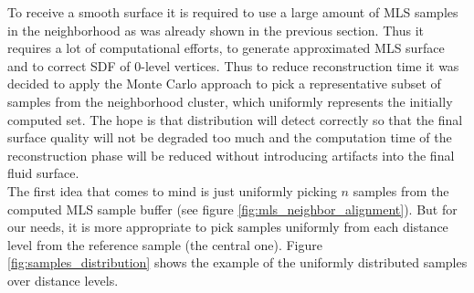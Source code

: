 To receive a smooth surface it is required to use a large amount of MLS samples in the neighborhood as was already shown in the previous section. Thus it requires a lot of computational efforts, to generate approximated MLS surface and to correct SDF of 0-level vertices. Thus to reduce reconstruction time it was decided to apply the Monte Carlo approach to pick a representative subset of samples from the neighborhood cluster, which uniformly represents the initially computed set. The hope is that distribution will detect correctly so that the final surface quality will not be degraded too much and the computation time of the reconstruction phase will be reduced without introducing artifacts into the final fluid surface.\\
The first idea that comes to mind is just uniformly picking $n$ samples from the computed MLS sample buffer (see figure \ref{fig:mls_neighbor_alignment}). But for our needs, it is more appropriate to pick samples uniformly from each distance level from the reference sample (the central one). Figure \ref{fig:samples_distribution} shows the example of the uniformly distributed samples over distance levels.
